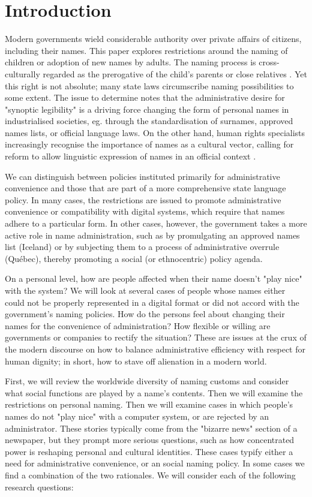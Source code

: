 \section{Introduction}

Modern governments wield considerable authority over private affairs of
citizens, including their names. This paper explores restrictions around the
naming of children or adoption of new names by adults. The naming process is
cross-culturally regarded as the prerogative of the child's parents or close
relatives \parencite{alford88}. Yet this right is not absolute; many state laws
circumscribe naming possibilities to some extent. The issue to determine
\textcite{scott02} notes that the administrative desire for "synoptic
legibility" is a driving force changing the form of personal names in
industrialised societies, eg. through the standardisation of surnames, approved
names lists, or official language laws. On the other hand, human rights
specialists increasingly recognise the importance of names as a cultural vector,
calling for reform to allow linguistic expression of names in an official
context \parencite{varennes15}.

We can distinguish between policies instituted primarily for administrative
convenience and those that are part of a more comprehensive state language
policy. In many cases, the restrictions are issued to promote administrative
convenience or compatibility with digital systems, which require that names
adhere to a particular form. In other cases, however, the government takes a
more active role in name administration, such as by promulgating an approved
names list (Iceland) or by subjecting them to a process of administrative
overrule (Québec), thereby promoting a social (or ethnocentric) policy agenda.

On a personal level, how are people affected when their name doesn't "play nice"
with the system? We will look at several cases of people whose names either
could not be properly represented in a digital format or did not accord with the
government's naming policies. How do the persons feel about changing their names
for the convenience of administration? How flexible or willing are governments
or companies to rectify the situation? These are issues at the crux of the
modern discourse on how to balance administrative efficiency with respect for
human dignity; in short, how to stave off alienation in a modern world.

First, we will review the worldwide diversity of naming customs and consider
what social functions are played by a name's contents. Then we will examine the
restrictions on personal naming. Then we will examine cases in which people's
names do not "play nice" with a computer system, or are rejected by an
administrator. These stories typically come from the "bizarre news" section of a
newspaper, but they prompt more serious questions, such as how concentrated
power is reshaping personal and cultural identities. These cases typify either a
need for administrative convenience, or an social naming policy. In some cases
we find a combination of the two rationales. We will consider each of the
following research questions:

